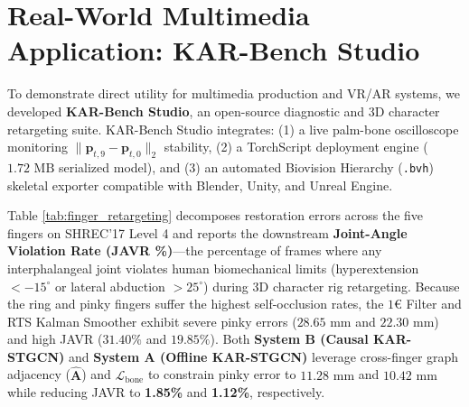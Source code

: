 \documentclass[10pt,twocolumn]{article}
\begin{document}
\section{Real-World Multimedia Application: KAR-Bench Studio}
To demonstrate direct utility for multimedia production and VR/AR systems, we developed \textbf{KAR-Bench Studio}, an open-source diagnostic and 3D character retargeting suite. KAR-Bench Studio integrates: (1) a live palm-bone oscilloscope monitoring $\|\mathbf{p}_{t,9}-\mathbf{p}_{t,0}\|_2$ stability, (2) a TorchScript deployment engine ($1.72\text{ MB}$ serialized model), and (3) an automated Biovision Hierarchy (\texttt{.bvh}) skeletal exporter compatible with Blender, Unity, and Unreal Engine.

Table \ref{tab:finger_retargeting} decomposes restoration errors across the five fingers on SHREC'17 Level 4 and reports the downstream \textbf{Joint-Angle Violation Rate (JAVR \%)}—the percentage of frames where any interphalangeal joint violates human biomechanical limits (hyperextension $<-15^\circ$ or lateral abduction $>25^\circ$) during 3D character rig retargeting. Because the ring and pinky fingers suffer the highest self-occlusion rates, the $1\text{€}$ Filter \cite{casiez2012oneeuro} and RTS Kalman Smoother exhibit severe pinky errors ($28.65\text{ mm}$ and $22.30\text{ mm}$) and high JAVR ($31.40\%$ and $19.85\%$). Both \textbf{System B (Causal KAR-STGCN)} and \textbf{System A (Offline KAR-STGCN)} leverage cross-finger graph adjacency ($\hat{\mathbf{A}}$) and $\mathcal{L}_{\text{bone}}$ to constrain pinky error to $11.28\text{ mm}$ and $10.42\text{ mm}$ while reducing JAVR to \textbf{1.85\%} and \textbf{1.12\%}, respectively.
\end{document}

